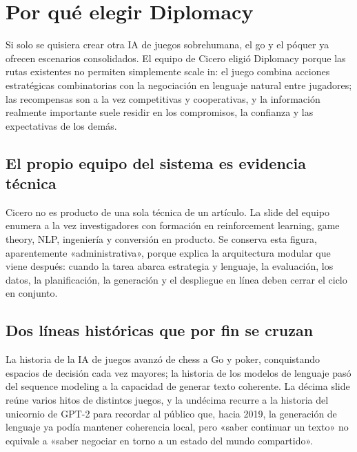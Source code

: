 \section{Por qué elegir Diplomacy}

Si solo se quisiera crear otra IA de juegos sobrehumana, el go y el póquer ya ofrecen escenarios consolidados. El equipo de Cicero eligió Diplomacy porque las rutas existentes no permiten simplemente scale in: el juego combina acciones estratégicas combinatorias con la negociación en lenguaje natural entre jugadores; las recompensas son a la vez competitivas y cooperativas, y la información realmente importante suele residir en los compromisos, la confianza y las expectativas de los demás.

\subsection{El propio equipo del sistema es evidencia técnica}

Cicero no es producto de una sola técnica de un artículo. La slide del equipo enumera a la vez investigadores con formación en reinforcement learning, game theory, NLP, ingeniería y conversión en producto. Se conserva esta figura, aparentemente «administrativa», porque explica la arquitectura modular que viene después: cuando la tarea abarca estrategia y lenguaje, la evaluación, los datos, la planificación, la generación y el despliegue en línea deben cerrar el ciclo en conjunto.



\subsection{Dos líneas históricas que por fin se cruzan}

La historia de la IA de juegos avanzó de chess a Go y poker, conquistando espacios de decisión cada vez mayores; la historia de los modelos de lenguaje pasó del sequence modeling a la capacidad de generar texto coherente. La décima slide reúne varios hitos de distintos juegos, y la undécima recurre a la historia del unicornio de GPT-2 para recordar al público que, hacia 2019, la generación de lenguaje ya podía mantener coherencia local, pero «saber continuar un texto» no equivale a «saber negociar en torno a un estado del mundo compartido».

